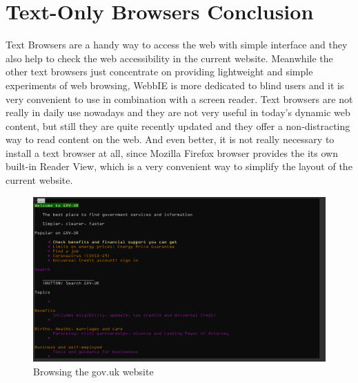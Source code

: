 

\section{Text-Only Browsers Conclusion}

Text Browsers are a handy way to access the web with simple 
interface and they also help to check the web accessibility 
in the current website. Meanwhile the other text browsers just 
concentrate on providing lightweight and simple experiments of 
web browsing, WebbIE is more dedicated to blind users and it is 
very convenient to use in combination with a screen reader. Text 
browsers are not really in daily use nowadays and they are not very 
useful in today's dynamic web content, but still they are quite 
recently updated and they offer a non-distracting way to read 
content on the web. And even better, it is not really necessary to 
install a text browser at all, since Mozilla Firefox browser provides the 
its own built-in Reader View, which is a very convenient way to simplify 
the layout of the current website.


\begin{figure}[tp]
\centering
\includegraphics[keepaspectratio,width=\linewidth]
{images/lynx-gov}

\caption[Lynx browser]
{%
Browsing the gov.uk website
}%
\label{fig:lynx-gov}
\end{figure}


